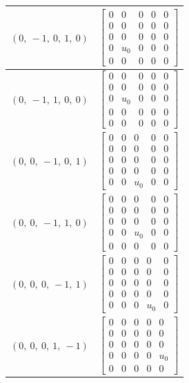 \documentclass[11pt]{article}
\theoremstyle{definition}
\begin{document}
\begin{longtable}{|l|c|}
    \hline
    $\left( 0, \  -1, \  0, \  1, \  0\right)$ & ${\left[\begin{matrix}0 & 0 & 0 & 0 & 0\\0 & 0 & 0 & 0 & 0\\0 & 0 & 0 & 0 & 0\\0 & u_{0} & 0 & 0 & 0\\0 & 0 & 0 & 0 & 0\end{matrix}\right]}$ \\
    \hline
    $\left( 0, \  -1, \  1, \  0, \  0\right)$ & ${\left[\begin{matrix}0 & 0 & 0 & 0 & 0\\0 & 0 & 0 & 0 & 0\\0 & u_{0} & 0 & 0 & 0\\0 & 0 & 0 & 0 & 0\\0 & 0 & 0 & 0 & 0\end{matrix}\right]}$ \\
    \hline
    $\left( 0, \  0, \  -1, \  0, \  1\right)$ & ${\left[\begin{matrix}0 & 0 & 0 & 0 & 0\\0 & 0 & 0 & 0 & 0\\0 & 0 & 0 & 0 & 0\\0 & 0 & 0 & 0 & 0\\0 & 0 & u_{0} & 0 & 0\end{matrix}\right]}$ \\
    \hline
    $\left( 0, \  0, \  -1, \  1, \  0\right)$ & ${\left[\begin{matrix}0 & 0 & 0 & 0 & 0\\0 & 0 & 0 & 0 & 0\\0 & 0 & 0 & 0 & 0\\0 & 0 & u_{0} & 0 & 0\\0 & 0 & 0 & 0 & 0\end{matrix}\right]}$ \\
    \hline
    $\left( 0, \  0, \  0, \  -1, \  1\right)$ & ${\left[\begin{matrix}0 & 0 & 0 & 0 & 0\\0 & 0 & 0 & 0 & 0\\0 & 0 & 0 & 0 & 0\\0 & 0 & 0 & 0 & 0\\0 & 0 & 0 & u_{0} & 0\end{matrix}\right]}$ \\
    \hline
    $\left( 0, \  0, \  0, \  1, \  -1\right)$ & ${\left[\begin{matrix}0 & 0 & 0 & 0 & 0\\0 & 0 & 0 & 0 & 0\\0 & 0 & 0 & 0 & 0\\0 & 0 & 0 & 0 & u_{0}\\0 & 0 & 0 & 0 & 0\end{matrix}\right]}$ \\

\end{longtable}
\end{document}
